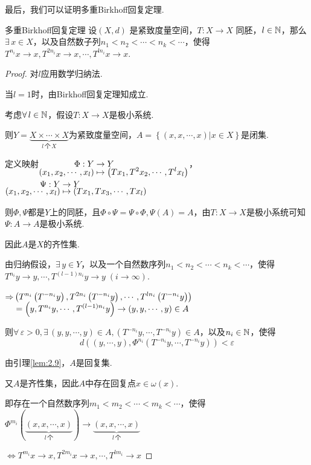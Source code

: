 最后，我们可以证明多重Birkhoff回复定理.
\begin{theorem*}{多重Birkhoff回复定理}
    设$(X,d)$ 是紧致度量空间，$T:X\to X$ 同胚，$l\in\mathbb{N}$，那么$\exists\, x\in X$，以及自然数子列$n_1<n_2<\cdots<n_k<\cdots$，使得$T^{n_i}x\to x,T^{2n_i}x\to x,\cdots,T^{ln_i}x\to x$.
\end{theorem*}
\begin{proof}
    对$l$应用数学归纳法.\par
    当$l=1$时，由Birkhoff回复定理知成立.\par
    考虑$\forall\, l\in\mathbb{N}$，假设$T:X\to X$是极小系统.\par
    则$Y=\underbrace{X\times\cdots\times X}_{l\,\text{个}\,X}$为紧致度量空间，$A=\left\{(x,x,\cdots,x)|x\in X\right\}$是闭集.\par
    定义映射$\setjot[-4]\begin{aligned}[t]
        \Phi:Y &\to Y \\
        (x_1,x_2,\cdots,x_l) &\mapsto \left(Tx_1,T^2x_2,\cdots,T^lx_l\right)
    \end{aligned}$，$\setjot[-4]\begin{aligned}[t]
        \Psi:Y &\to Y \\
        (x_1,x_2,\cdots,x_l) &\mapsto \left(Tx_1,Tx_3,\cdots,Tx_l\right)
    \end{aligned}$\par
    则$\Phi,\Psi$都是$Y$上的同胚，且$\Phi\circ\Psi=\Psi\circ\Phi,\Psi(A)=A$，由$T:X\to X$是极小系统可知$\Psi:A\to A$是极小系统.\par
    因此$A$是$X$的齐性集.\par
    由归纳假设，$\exists\, y\in Y$，以及一个自然数序列$n_1<n_2<\cdots<n_k<\cdots$，使得$T^{n_i}y\to y,\cdots,T^{(l-1)n_i}y\to y\;(i\to\infty)$.\par
    $\setjot[-2]\begin{aligned}[t]
        \Rightarrow &\left(T^{n_i}\left(T^{-n_i}y\right),T^{2n_i}\left(T^{-n_i}y\right),\cdots,T^{ln_i}\left(T^{-n_i}y\right)\right)\\
        &=\left(y,T^{n_i}y,\cdots,T^{(l-1)n_i}y\right)\to(y,y,\cdots,y)\in A
    \end{aligned}$\par
    则$\forall\,\varepsilon>0,\exists\,(y,y,\cdots,y)\in A,\left(T^{-n_i}y,\cdots,T^{-n_i}y\right)\in A$，以及$n_i\in\mathbb{N}$，使得$$d \left((y,\cdots,y),\Phi^{n_i}\left(T^{-n_i}y,\cdots,T^{-n_i}y\right)\right)<\varepsilon$$ \par
    由引理\ref{lem:2.9}，$A$是回复集.\par
    又$A$是齐性集，因此$A$中存在回复点$x\in \omega(x)$.\par
    即存在一个自然数序列$m_1<m_2<\cdots<m_k<\cdots$，使得$\Phi^{m_i}(\underbrace{(x,x,\cdots,x)}_{l\,\text{个}})\to\underbrace{(x,x,\cdots,x)}_{l\,\text{个}}$ \par
    $\Leftrightarrow T^{m_i}x\to x,T^{2m_i}x\to x,\cdots,T^{lm_i}\to x$
\end{proof}


